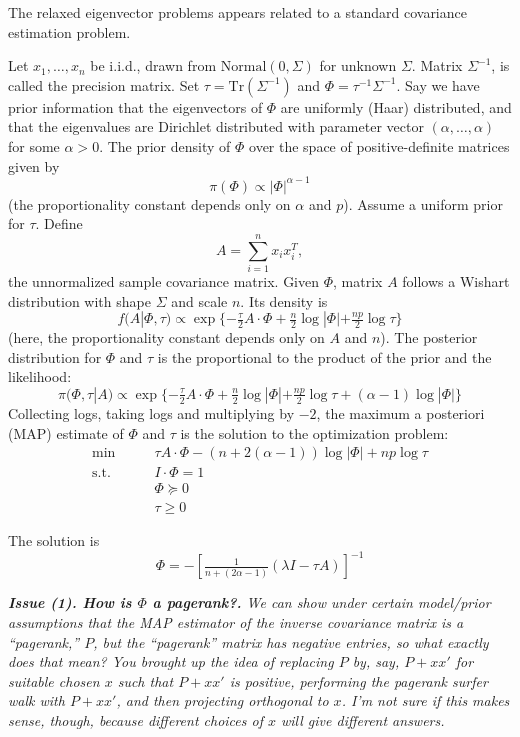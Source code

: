 \documentclass{article}
\begin{document}
The relaxed eigenvector problems appears related to a standard covariance estimation problem.


Let $x_1, \ldots, x_n$ be i.i.d., drawn from $\mathrm{Normal}(0, \Sigma)$
for unknown $\Sigma$.  Matrix $\Sigma^{-1}$, is called the precision
matrix.  Set $\tau = \mathrm{Tr}(\Sigma^{-1})$ and
$\Phi = \tau^{-1} \Sigma^{-1}$.  Say we have prior information that the
eigenvectors of $\Phi$ are uniformly (Haar) distributed, and that the
eigenvalues are Dirichlet distributed with parameter vector
$(\alpha, \ldots, \alpha)$ for some $\alpha > 0$.  The prior density
of $\Phi$ over the space of positive-definite matrices given by
\[
    \pi(\Phi) \propto |\Phi|^{\alpha-1}
\]
(the proportionality constant depends only on $\alpha$ and $p$).
Assume a uniform prior for $\tau$.
Define
\[
    A = \sum_{i=1}^n x_i x_i^T,
\]
the unnormalized sample covariance matrix.  Given $\Phi$, matrix $A$
follows a Wishart distribution with shape $\Sigma$ and scale $n$.  Its
density is
\[
    f(A | \Phi, \tau)
        \propto
        \exp\{
            -\tfrac{\tau}{2} A \cdot \Phi
            + \tfrac{n}{2} \log | \Phi| + \tfrac{np}{2} \log \tau
        \}
\]
(here, the proportionality constant depends only on $A$ and $n$).  The
posterior distribution for $\Phi$ and $\tau$ is the proportional to the
product of the prior and the likelihood:
\[
    \pi(\Phi, \tau | A)
        \propto
        \exp\{
            -\tfrac{\tau}{2} A \cdot \Phi
            + \tfrac{n}{2} \log | \Phi| + \tfrac{np}{2} \log \tau
            +
            (\alpha - 1)
            \log |\Phi|
        \}
\]
Collecting logs, taking logs and multiplying by $-2$, the maximum a
posteriori (MAP) estimate of $\Phi$ and $\tau$ is the solution to the
optimization problem:
\begin{align*}
    \min \qquad &\tau A \cdot \Phi - (n + 2 (\alpha - 1)) \log |\Phi| + np \log \tau \\
    \text{s.t.} \qquad & I \cdot \Phi = 1 \\
    \phantom{\text{s.t.}} \qquad & \Phi \succeq 0 \\
    \phantom{\text{s.t.}} \qquad & \tau \geq 0
\end{align*}

The solution is
\[
    \Phi = - [\tfrac{1}{n + (2\alpha - 1)}(\lambda I - \tau A)]^{-1}
\]

\textit{\textbf{Issue (1). How is $\Phi$ a pagerank?.}
We can show under certain model/prior assumptions that the MAP estimator of the inverse covariance matrix is a ``pagerank,'' $P$, but the ``pagerank'' matrix has negative entries, so what exactly does that mean?  You brought up the idea of replacing $P$ by, say, $P + x x'$ for suitable chosen $x$ such that $P + x x'$ is positive, performing the pagerank surfer walk with $P + x x'$, and then projecting orthogonal to $x$.  I'm not sure if this makes sense, though, because different choices of $x$ will give different answers.}
\end{document}
